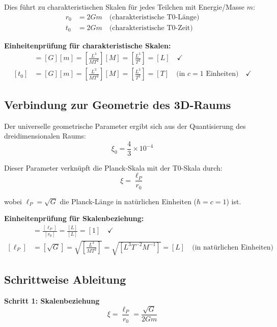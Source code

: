\documentclass[12pt,a4paper]{article}
\newcommand{\xiconst}{\xi_0 = \frac{4}{3} \times 10^{-4}}
\theoremstyle{definition}
\begin{document}
	Dies führt zu charakteristischen Skalen für jedes Teilchen mit Energie/Masse $m$:
	\begin{align}
		r_0 &= 2Gm \quad \text{(charakteristische T0-Länge)} \\
		t_0 &= 2Gm \quad \text{(charakteristische T0-Zeit)}
	\end{align}
	
	\textbf{Einheitenprüfung für charakteristische Skalen:}
	\begin{align}
		[r_0] &= [G][m] = \left[\frac{L^3}{MT^2}\right][M] = \left[\frac{L^3}{T^2}\right] = [L] \quad \checkmark \\
		[t_0] &= [G][m] = \left[\frac{L^3}{MT^2}\right][M] = \left[\frac{L^3}{T^2}\right] = [T] \quad \text{(in } c=1 \text{ Einheiten)} \quad \checkmark
	\end{align}
	
	\subsection{Verbindung zur Geometrie des 3D-Raums}
	
	Der universelle geometrische Parameter ergibt sich aus der Quantisierung des dreidimensionalen Raums:
	\begin{equation}
		\xiconst
	\end{equation}
	
	Dieser Parameter verknüpft die Planck-Skala mit der T0-Skala durch:
	\begin{equation}
		\xi = \frac{\ell_P}{r_0}
	\end{equation}
	
	wobei $\ell_P = \sqrt{G}$ die Planck-Länge in natürlichen Einheiten ($\hbar = c = 1$) ist.
	
	\textbf{Einheitenprüfung für Skalenbeziehung:}
	\begin{align}
		[\xi] &= \frac{[\ell_P]}{[r_0]} = \frac{[L]}{[L]} = [1] \quad \checkmark \\
		[\ell_P] &= [\sqrt{G}] = \sqrt{\left[\frac{L^3}{MT^2}\right]} = \sqrt{[L^3T^{-2}M^{-1}]} = [L] \quad \text{(in natürlichen Einheiten)}
	\end{align}
	
	\subsection{Schrittweise Ableitung}
	
	\textbf{Schritt 1: Skalenbeziehung}
	\begin{equation}
		\xi = \frac{\ell_P}{r_0} = \frac{\sqrt{G}}{2Gm}
	\end{equation}
	
\end{document}
